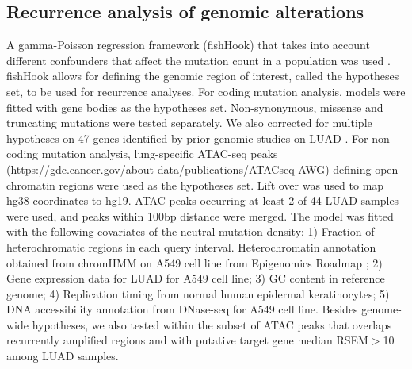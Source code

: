 \documentclass[phd,tocprelim]{cornell}
\begin{document}

\subsection*{Recurrence analysis of genomic alterations}
A gamma-Poisson regression framework (fishHook) that takes into account different confounders that affect the mutation count in a population was used \cite{Imielinski2017-nt}. fishHook allows for defining the genomic region of interest, called the hypotheses set, to be used for recurrence analyses. For coding mutation analysis, models were fitted with gene bodies as the hypotheses set. Non-synonymous, missense and truncating mutations were tested separately. We also corrected for multiple hypotheses on 47 genes identified by prior genomic studies on LUAD \cite{Campbell2016-xv,Cancer_Genome_Atlas_Research_Network2014-ju,Imielinski2012-vv}. For non-coding mutation analysis, lung-specific ATAC-seq peaks (https://gdc.cancer.gov/about-data/publications/ATACseq-AWG) defining open chromatin regions \cite{Corces2018-nl} were used as the hypotheses set. Lift over was used to map hg38 coordinates to hg19. ATAC peaks occurring at least 2 of 44 LUAD samples were used, and peaks within 100bp distance were merged. The model was fitted with the following covariates of the neutral mutation density: 1) Fraction of heterochromatic regions in each query interval. Heterochromatin annotation obtained from chromHMM on A549 cell line from Epigenomics Roadmap \cite{Roadmap_Epigenomics_Consortium2015-mg}; 2) Gene expression data for LUAD for A549 cell line; 3) GC content in reference genome; 4) Replication timing from normal human epidermal keratinocytes; 5) DNA accessibility annotation from DNase-seq for A549 cell line. Besides genome-wide hypotheses, we also tested within the subset of ATAC peaks that overlaps recurrently amplified regions \cite{Campbell2016-xv} and with putative target gene median RSEM$>$10 among LUAD samples.
\end{document}
